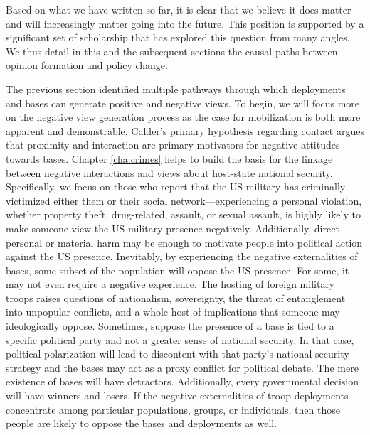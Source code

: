 Based on what we have written so far, it is clear that we believe it does matter and will increasingly matter going into the future. This position is supported by a significant set of scholarship that has explored this question from many angles. We thus detail in this and the subsequent sections the causal paths between opinion formation and policy change.


The previous section identified multiple pathways through which deployments and bases can generate positive and negative views. To begin, we will focus more on the negative view generation process as the case for mobilization is both more apparent and demonstrable. Calder's primary hypothesis regarding contact argues that proximity and interaction are primary motivators for negative attitudes towards bases.\autocite{calder2007} Chapter \ref{cha:crimes} helps to build the basis for the linkage between negative interactions and views about host-state national security. Specifically, we focus on those who report that the US military has criminally victimized either them or their social network---experiencing a personal violation, whether property theft, drug-related, assault, or sexual assault, is highly likely to make someone view the US military presence negatively. Additionally, direct personal or material harm may be enough to motivate people into political action against the US presence. Inevitably, by experiencing the negative externalities of bases, some subset of the population will oppose the US presence. For some, it may not even require a negative experience. The hosting of foreign military troops raises questions of nationalism, sovereignty, the threat of entanglement into unpopular conflicts, and a whole host of implications that someone may ideologically oppose. Sometimes, suppose the presence of a base is tied to a specific political party and not a greater sense of national security. In that case, political polarization will lead to discontent with that party's national security strategy and the bases may act as a proxy conflict for political debate. The mere existence of bases will have detractors. Additionally, every governmental decision will have winners and losers. If the negative externalities of troop deployments concentrate among particular populations, groups, or individuals, then those people are likely to oppose the bases and deployments as well. 


